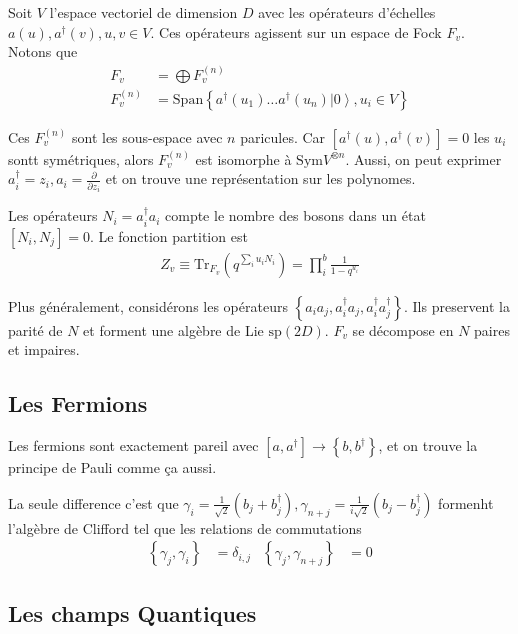 \documentclass[10pt]{report}
\newcommand{\ket}[1]{\left|#1\right>}
\newcommand{\pd}[2]{\frac{\partial #1}{\partial#2}}
\begin{document}
Soit $V$ l'espace vectoriel de dimension $D$ avec les op\'erateurs d'\'echelles $a(u),a^\dagger(v), u,v \in V$. Ces op\'erateurs agissent sur un espace de Fock $F_v$. Notons que
\begin{align}
    F_v &= \bigoplus F_v^{(n)}\\
    F_v^{(n)} &= \mathrm{Span}\left\{ a^\dagger(u_1)\dots a^\dagger(u_n) \ket{0}, u_i \in V \right\}
\end{align}

Ces $F_v^{(n)}$ sont les sous-espace avec $n$ paricules. Car $\left[ a^\dagger(u), a^\dagger(v) \right] = 0$ les $u_i$ sontt sym\'etriques, alors $F_v^{(n)}$ est isomorphe \`a $\mathrm{Sym} V^{\otimes n}$. Aussi, on peut exprimer $a_i^\dagger = z_i, a_i = \pd{}{z_i}$ et on trouve une repr\'esentation sur les polynomes.

Les op\'erateurs $N_i = a_i^\dagger a_i$ compte le nombre des bosons dans un \'etat $[N_i, N_j] = 0$. Le fonction partition est
\begin{align}
    Z_v \equiv \mathrm{Tr}_{F_v} \left( q^{\sum\limits_{i}^{}u_i N_i} \right) = \prod_i^b \frac{1}{1 - q^{u_i}}
\end{align}

Plus g\'en\'eralement, consid\'erons les op\'erateurs $\left\{ a_ia_j, a_i^\dagger a_j, a_i^\dagger a_j^\dagger \right\}$. Ils preservent la parit\'e de $N$ et forment une alg\`ebre de Lie $\mathrm{sp}(2D)$. $F_v$ se d\'ecompose en $N$ paires et impaires.

\subsection{Les Fermions}

Les fermions sont exactement pareil avec $[a, a^\dagger] \to \left\{ b, b^\dagger \right\}$, et on trouve la principe de Pauli comme \c{c}a aussi.

La seule difference c'est que $\gamma_i = \frac{1}{\sqrt{2}}\left( b_j + b_j^\dagger \right), \gamma_{n+j} = \frac{1}{i\sqrt{2}}\left( b_j - b_j^\dagger \right)$ formenht l'alg\`ebre de Clifford tel que les relations de commutations
\begin{align}
    \left\{ \gamma_j, \gamma_i \right\} &= \delta_{i,j} &
    \left\{ \gamma_j, \gamma_{n+j} \right\} &= 0
\end{align}

\subsection{Les champs Quantiques}
\end{document}
